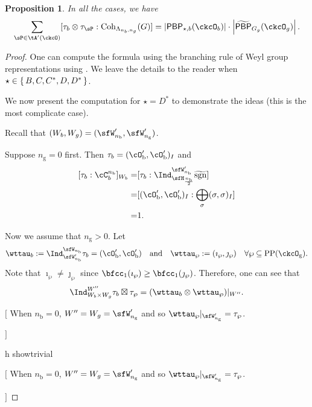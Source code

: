 \documentclass[12pt,a4paper]{amsart}
\newcommand{\trivial}[2][]{\if\relax\detokenize{#1}\relax
  {%
      \color{orange} \vspace{0em} $[$  #2 $]$
      \color{black}
  }
  \else
\ifx#1h
\ifcsname showtrivial\endcsname
{%
    \color{orange} \vspace{0em}  $[$ #2 $]$
    \color{black}
}
\fi
\else {\red Wrong argument!} \fi
\fi
}
\def\abs#1{\left|{#1}\right|}
\newcommand{\sgn}{\operatorname{sgn}}
\numberwithin{equation}{section}
\newtheorem{prop}[thm]{Proposition}
\theoremstyle{remark}
\def\Unip{\mathrm{Unip}}
\def\LC{{}^{\scriptscriptstyle L}\sC}
\def\nbb{n_{\mathrm b}}
\def\ngg{n_{\mathrm g}}
\def\AND{\quad \text{and} \quad}
\def\Coh{\mathrm{Coh}}
\def\CPP{\mathrm{PP}}
\def\tPBP{\widetilde{\mathsf{PBP}}}
\def\tsgn{\widetilde{\sgn}}
\def\PBP{\mathsf{PBP}}
\def\cOpb{\cO'_{\mathrm b}}
\def\ckcOg{\ckcO_{\mathrm g}}
\def\tPBP{\widetilde{\mathsf{PBP}}}
\begin{document}
\begin{prop}
  In all the cases, we have
  \[
    \sum_{\sP\in \tA'(\ckcO)} [\tau_{b}\otimes \tau_{\sP}: \Coh_{\Lambda_{n_{b},n_{g}}}(G)] = \abs{\PBP_{\star,b}(\ckcO_{b})}\cdot \abs{\tPBP_{G_{g}}(\ckcO_{g})}.
  \]
\end{prop}
\begin{proof}
  One can compute the formula using the branching rule of Weyl group
  representations using . We leave the details to the reader
  when $\star\in \set{B,C,C^{*},D,D^{*}}$.

  We now present the computation for $\star = D^{*}$ to demonstrate the ideas
  (this is the most complicate case).

  Recall that $(W_{b},W_{g}) = (\sfW'_{\nbb},\sfW'_{\ngg})$.

  Suppose $\ngg = 0$ first. Then $\tau_{b} = (\cOpb,\cOpb)_{I}$ and
  \[
    \begin{split}
      [\tau_{b}:\cC_{b}^{\nbb}]_{W_{b}} = &
      [\tau_{b}: \Ind_{\sfH_{\frac{\nbb}{2}}}^{\sfW'_{\nbb}}\tsgn]\\
      = & [(\cOpb,\cOpb)_{I}: \bigoplus_{\sigma}(\sigma,\sigma)_{I}]\\
      = & 1.
    \end{split}
  \]

  Now we assume that $\ngg>0$. Let
  \[
    \wttau_{b} := \Ind_{\sfW'_{\nbb}}^{\sfW_{\nbb}} \tau_{b} = (\cOpb,\cOpb) \AND \wttau_{\wp}: = (\imath_{\wp},\jmath_{\wp}) \quad \forall \wp \subseteq \CPP(\ckcOg).
  \]
  Note that $\imath_{\wp}\neq \jmath_{\wp}$ since
  $\bfcc_{1}(\imath_{\wp})\geq \bfcc_{1}(\jmath_{\wp})$. Therefore, one can see
  that
  \begin{equation}\label{eq:W''}
    \Ind_{W_{b}\times W_{g}}^{W''} \tau_{b}\boxtimes \tau_{\wp}
    = (\wttau_{b}\otimes \wttau_{\wp})|_{W''}.
  \end{equation}

  \trivial[]{ When $\nbb=0$, $W'' = W_{g} = \sfW'_{\ngg}$ and so
    $\wttau_{\wp}|_{\sfW'_{\ngg}} = \tau_{\wp}$.

}
\end{proof}
\end{document}
